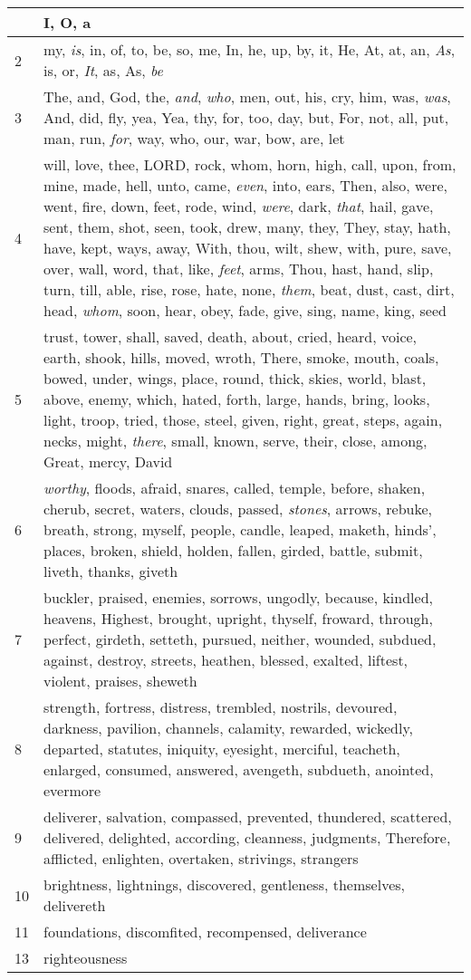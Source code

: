 \begin{longtable}{l|p{3.75in}}
\hline \hline
\endlastfoot
1 & I, O, a \\ \hline
2 & my, \emph{is}, in, of, to, be, so, me, In, he, up, by, it, He, At, at, an, \emph{As}, is, or, \emph{It}, as, As, \emph{be} \\ \hline
3 & The, and, God, the, \emph{and}, \emph{who}, men, out, his, cry, him, was, \emph{was}, And, did, fly, yea, Yea, thy, for, too, day, but, For, not, all, put, man, run, \emph{for}, way, who, our, war, bow, are, let \\ \hline
4 & will, love, thee, LORD, rock, whom, horn, high, call, upon, from, mine, made, hell, unto, came, \emph{even}, into, ears, Then, also, were, went, fire, down, feet, rode, wind, \emph{were}, dark, \emph{that}, hail, gave, sent, them, shot, seen, took, drew, many, they, They, stay, hath, have, kept, ways, away, With, thou, wilt, shew, with, pure, save, over, wall, word, that, like, \emph{feet}, arms, Thou, hast, hand, slip, turn, till, able, rise, rose, hate, none, \emph{them}, beat, dust, cast, dirt, head, \emph{whom}, soon, hear, obey, fade, give, sing, name, king, seed \\ \hline
5 & trust, tower, shall, saved, death, about, cried, heard, voice, earth, shook, hills, moved, wroth, There, smoke, mouth, coals, bowed, under, wings, place, round, thick, skies, world, blast, above, enemy, which, hated, forth, large, hands, bring, looks, light, troop, tried, those, steel, given, right, great, steps, again, necks, might, \emph{there}, small, known, serve, their, close, among, Great, mercy, David \\ \hline
6 & \emph{worthy}, floods, afraid, snares, called, temple, before, shaken, cherub, secret, waters, clouds, passed, \emph{stones}, arrows, rebuke, breath, strong, myself, people, candle, leaped, maketh, hinds', places, broken, shield, holden, fallen, girded, battle, submit, liveth, thanks, giveth \\ \hline
7 & buckler, praised, enemies, sorrows, ungodly, because, kindled, heavens, Highest, brought, upright, thyself, froward, through, perfect, girdeth, setteth, pursued, neither, wounded, subdued, against, destroy, streets, heathen, blessed, exalted, liftest, violent, praises, sheweth \\ \hline
8 & strength, fortress, distress, trembled, nostrils, devoured, darkness, pavilion, channels, calamity, rewarded, wickedly, departed, statutes, iniquity, eyesight, merciful, teacheth, enlarged, consumed, answered, avengeth, subdueth, anointed, evermore \\ \hline
9 & deliverer, salvation, compassed, prevented, thundered, scattered, delivered, delighted, according, cleanness, judgments, Therefore, afflicted, enlighten, overtaken, strivings, strangers \\ \hline
10 & brightness, lightnings, discovered, gentleness, themselves, delivereth \\ \hline
11 & foundations, discomfited, recompensed, deliverance \\ \hline
13 & righteousness \\ \hline
\end{longtable}






